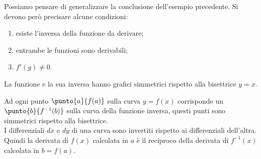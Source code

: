 Possiamo pensare di generalizzare la conclusione dell'esempio precedente. 
Si devono però precisare alcune condizioni:
\begin{enumerate} [noitemsep]
\item esiste l'inversa della funzione da derivare;
\item entrambe le funzioni sono derivabili;
\item \(f'(g) \ne 0\).
\end{enumerate}

\begin{inaccessibleblock}
\begin{center}
\begin{minipage}[]{.55\textwidth}
\diffinversa
\end{minipage} 
\hfill
\begin{minipage}[]{.42\textwidth}
La funzione e la sua inversa hanno grafici simmetrici rispetto alla 
bisettrice \(y=x\).

Ad ogni punto \(\punto{a}{f(a)}\) 
sulla curva \(y=f(x)\) 
corrisponde un \(\punto{b}{f^{-1}(b)}\) 
sulla curva della funzione inversa, 
questi punti sono simmetrici rispetto alla bisettrice. \\
I differenziali \(dx\) e \(dy\) di una curva sono invertiti rispetto ai 
differenziali dell'altra.
Quindi la derivata di \(f(x)\) calcolata in \(a\) è il reciproco 
della derivata di \(f^{-1}(x)\) calcolata in \(b = f(a)\).
\end{minipage}
\end{center}
\end{inaccessibleblock}
\label{}

